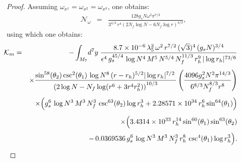 \documentclass[a4paper,11pt,fleqn]{article}
\theoremstyle{plain}
\theoremstyle{definition}
\newcommand{\rh}{r_h}
\newcommand{\logN}{\log N}
\newcommand{\logrh}{\log r_h}
\begin{document}
\begin{proof}
Assuming $\omega_{x^1} = \omega_{x^2} = \omega_{x^3}$, one obtains:
%
\begin{eqnarray}
\label{Nomega}
\mathcal{N}_\omega
&=& \frac{128 g_s N\omega^2\pi^{7/3}}{3^{4/3}\,r^4
    \left(2 N_f\log N -6 N_f\log\! r \right)^{4/3}},
\end{eqnarray}
%
using which one obtains:
%
\begin{eqnarray}
\label{Km}
\hskip -0.5 in  \mathcal{K}_m
&=& -\int_{M_7}\!d^7y\;
    \frac{8.7\times10^{-6}\,\lambda_5^2\,\omega^2\,r^{7/2}\,
          (\sqrt{3})^4\,(g_s N)^{3/4}}
         {\epsilon^4\,g_s^{45/4}\,\logN^4\,M^5\,N^{5/4}\,N_f^{11/3}\,
          \rh^9\,|\logrh|^{73/6}}
\nonumber\\[4pt]
\hskip -0.5 in && \times
   \frac{\sin^{58}\!\left(\theta_2\right)\csc^2\!\left(\theta_1\right)\,
         \logN^8\,(r-\rh)^{5/2}|\logrh|^{7/2}\,
         }
        {\left(2\log N-N_f\log\!\left(r^6+3r^4\rh^2\right)\right)^{10/3}}\left( \frac{4096g_s^2N^2\pi^{14/3}}{6^{8/3}N_f^{8/3}r^8}\right)
\nonumber\\[4pt]
\hskip -0.5 in&& \times
   \Bigl(g_s^6\,\logN^3\,M^3\,N_f^3\,
         \csc^{63}\!\left(\theta_2\right)\logrh^3
         + 2.28571\times10^{34}\,\rh^6\sin^{64}\!\left(\theta_1\right)\Bigr)
\nonumber\\[4pt]
\hskip -0.5 in&& \times
   \Bigl(3.4314\times10^{33}\,\rh^{14}
         \sin^{60}\!\left(\theta_1\right)\sin^{63}\!\left(\theta_2\right)
\nonumber\\[2pt]
\hskip -0.5 in&&\quad
         -\,0.0369536\,g_s^6\,\logN^3\,M^3\,N_f^3\,\rh^8\,
         \csc^4\!\left(\theta_1\right)\logrh^3\Bigr).
\end{eqnarray}


\end{proof}
\end{document}
